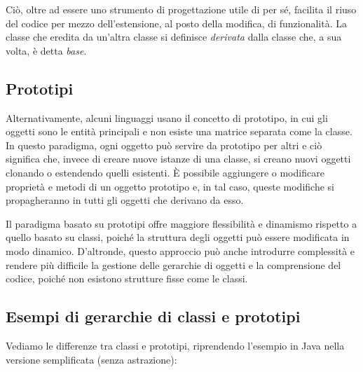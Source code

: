 \documentclass[
  letterpaper,
]{scrbook}
\begin{document}
Ciò, oltre ad essere uno strumento di progettazione utile di per sé,
facilita il riuso del codice per mezzo dell'estensione, al posto della
modifica, di funzionalità. La classe che eredita da un'altra classe si
definisce \emph{derivata} dalla classe che, a sua volta, è detta
\emph{base}.

\subsection{Prototipi}\label{prototipi}

Alternativamente, alcuni linguaggi usano il concetto di prototipo, in
cui gli oggetti sono le entità principali e non esiste una matrice
separata come la classe. In questo paradigma, ogni oggetto può servire
da prototipo per altri e ciò significa che, invece di creare nuove
istanze di una classe, si creano nuovi oggetti clonando o estendendo
quelli esistenti. È possibile aggiungere o modificare proprietà e metodi
di un oggetto prototipo e, in tal caso, queste modifiche si
propagheranno in tutti gli oggetti che derivano da esso.

Il paradigma basato su prototipi offre maggiore flessibilità e dinamismo
rispetto a quello basato su classi, poiché la struttura degli oggetti
può essere modificata in modo dinamico. D'altronde, questo approccio può
anche introdurre complessità e rendere più difficile la gestione delle
gerarchie di oggetti e la comprensione del codice, poiché non esistono
strutture fisse come le classi.

\subsection{Esempi di gerarchie di classi e
prototipi}\label{esempi-di-gerarchie-di-classi-e-prototipi}

Vediamo le differenze tra classi e prototipi, riprendendo l'esempio in
Java nella versione semplificata (senza astrazione):
\end{document}
